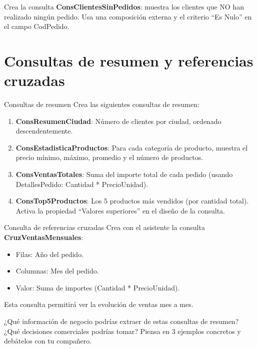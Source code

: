 \documentclass[12pt,a4paper]{article}
\begin{document}
\begin{reto}
Crea la consulta \textbf{ConsClientesSinPedidos}: muestra los clientes que NO han realizado ningún pedido. Usa una composición externa y el criterio ``Es Nulo'' en el campo CodPedido.
\end{reto}

\section{Consultas de resumen y referencias cruzadas}

\begin{practica}{Consultas de resumen}
Crea las siguientes consultas de resumen:
\begin{enumerate}
  \item \textbf{ConsResumenCiudad}: Número de clientes por ciudad, ordenado descendentemente.
  \item \textbf{ConsEstadisticaProductos}: Para cada categoría de producto, muestra el precio mínimo, máximo, promedio y el número de productos.
  \item \textbf{ConsVentasTotales}: Suma del importe total de cada pedido (usando DetallesPedido: Cantidad * PrecioUnidad).
  \item \textbf{ConsTop5Productos}: Los 5 productos más vendidos (por cantidad total). Activa la propiedad ``Valores superiores'' en el diseño de la consulta.
\end{enumerate}
\end{practica}

\begin{practica}{Consulta de referencias cruzadas}
Crea con el asistente la consulta \textbf{CruzVentasMensuales}:
\begin{itemize}
  \item Filas: Año del pedido.
  \item Columnas: Mes del pedido.
  \item Valor: Suma de importes (Cantidad * PrecioUnidad).
\end{itemize}
Esta consulta permitirá ver la evolución de ventas mes a mes.
\end{practica}

\begin{reflexion}
¿Qué información de negocio podrías extraer de estas consultas de resumen? ¿Qué decisiones comerciales podrías tomar? Piensa en 3 ejemplos concretos y debátelos con tu compañero.
\end{reflexion}
\end{document}

